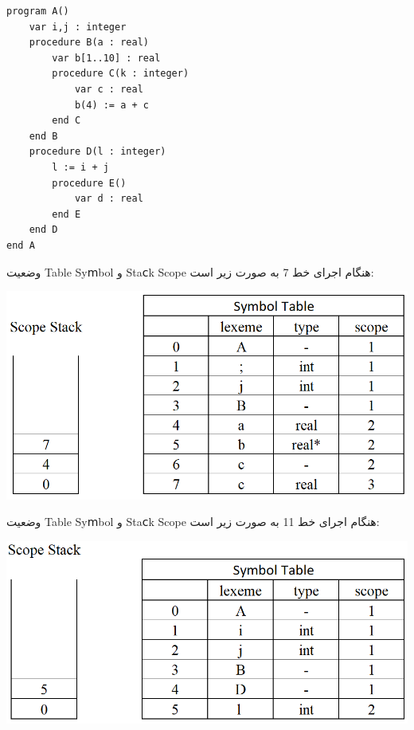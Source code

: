 \setLTR
\begin{lstlisting}
program A()
	var i,j : integer
	procedure B(a : real)
		var b[1..10] : real
		procedure C(k : integer)
			var c : real
			b(4) := a + c
		end C
	end B
	procedure D(l : integer)
		l := i + j
		procedure E()
			var d : real
		end E
	end D
end A
\end{lstlisting}
\setRTL



وضعیت Table Syⅿbol و Staⅽk Scope هنگام اجرای خط 7 به صورت زیر است:

\qquad\qquad\qquad\includegraphics[width=0.7\linewidth]{figs/1.png}

وضعیت Table Syⅿbol و Staⅽk Scope هنگام اجرای خط 11 به صورت زیر است:

\qquad\qquad\qquad\includegraphics[width=0.7\linewidth]{figs/2.png}
